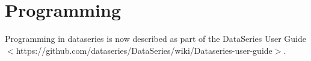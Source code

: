 \section{Programming}\label{sec:programming}

Programming in dataseries is now described as part of the DataSeries User Guide
$<$https://github.com/dataseries/DataSeries/wiki/Dataseries-user-guide$>$.

